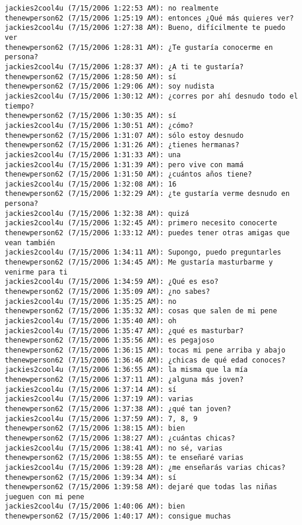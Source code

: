 \begin{verbatim}
jackies2cool4u (7/15/2006 1:22:53 AM): no realmente
thenewperson62 (7/15/2006 1:25:19 AM): entonces ¿Qué más quieres ver?
jackies2cool4u (7/15/2006 1:27:38 AM): Bueno, difícilmente te puedo ver
thenewperson62 (7/15/2006 1:28:31 AM): ¿Te gustaría conocerme en persona?
jackies2cool4u (7/15/2006 1:28:37 AM): ¿A ti te gustaría?
thenewperson62 (7/15/2006 1:28:50 AM): sí
thenewperson62 (7/15/2006 1:29:06 AM): soy nudista
jackies2cool4u (7/15/2006 1:30:12 AM): ¿corres por ahí desnudo todo el tiempo?
thenewperson62 (7/15/2006 1:30:35 AM): sí
jackies2cool4u (7/15/2006 1:30:51 AM): ¿cómo?
thenewperson62 (7/15/2006 1:31:07 AM): sólo estoy desnudo
thenewperson62 (7/15/2006 1:31:26 AM): ¿tienes hermanas?
jackies2cool4u (7/15/2006 1:31:33 AM): una
jackies2cool4u (7/15/2006 1:31:39 AM): pero vive con mamá
thenewperson62 (7/15/2006 1:31:50 AM): ¿cuántos años tiene?
jackies2cool4u (7/15/2006 1:32:08 AM): 16
thenewperson62 (7/15/2006 1:32:29 AM): ¿te gustaría verme desnudo en persona?
jackies2cool4u (7/15/2006 1:32:38 AM): quizá
jackies2cool4u (7/15/2006 1:32:45 AM): primero necesito conocerte
thenewperson62 (7/15/2006 1:33:12 AM): puedes tener otras amigas que vean también
jackies2cool4u (7/15/2006 1:34:11 AM): Supongo, puedo preguntarles
thenewperson62 (7/15/2006 1:34:45 AM): Me gustaría masturbarme y venirme para ti
jackies2cool4u (7/15/2006 1:34:59 AM): ¿Qué es eso?
thenewperson62 (7/15/2006 1:35:09 AM): ¿no sabes?
jackies2cool4u (7/15/2006 1:35:25 AM): no
thenewperson62 (7/15/2006 1:35:32 AM): cosas que salen de mi pene
jackies2cool4u (7/15/2006 1:35:40 AM): oh
jackies2cool4u (7/15/2006 1:35:47 AM): ¿qué es masturbar?
thenewperson62 (7/15/2006 1:35:56 AM): es pegajoso
thenewperson62 (7/15/2006 1:36:15 AM): tocas mi pene arriba y abajo
thenewperson62 (7/15/2006 1:36:46 AM): ¿chicas de qué edad conoces?
jackies2cool4u (7/15/2006 1:36:55 AM): la misma que la mía
thenewperson62 (7/15/2006 1:37:11 AM): ¿alguna más joven?
jackies2cool4u (7/15/2006 1:37:14 AM): sí
jackies2cool4u (7/15/2006 1:37:19 AM): varias
thenewperson62 (7/15/2006 1:37:38 AM): ¿qué tan joven?
jackies2cool4u (7/15/2006 1:37:59 AM): 7, 8, 9
thenewperson62 (7/15/2006 1:38:15 AM): bien
thenewperson62 (7/15/2006 1:38:27 AM): ¿cuántas chicas?
jackies2cool4u (7/15/2006 1:38:41 AM): no sé, varias
thenewperson62 (7/15/2006 1:38:55 AM): te enseñaré varias
jackies2cool4u (7/15/2006 1:39:28 AM): ¿me enseñarás varias chicas?
thenewperson62 (7/15/2006 1:39:34 AM): sí
thenewperson62 (7/15/2006 1:39:58 AM): dejaré que todas las niñas jueguen con mi pene
jackies2cool4u (7/15/2006 1:40:06 AM): bien
thenewperson62 (7/15/2006 1:40:17 AM): consigue muchas

\end{verbatim}

